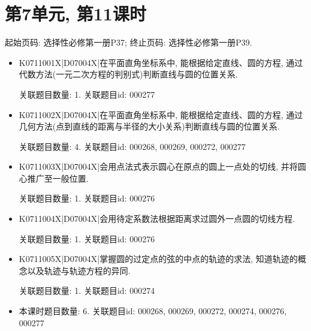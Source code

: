 \section*{第7单元, 第11课时}
起始页码: 选择性必修第一册P37; 终止页码: 选择性必修第一册P39.
\begin{itemize}
\item K0711001X|D07004X|在平面直角坐标系中, 能根据给定直线、圆的方程, 通过代数方法(一元二次方程的判别式)判断直线与圆的位置关系.

关联题目数量: 1. 关联题目id: 000277

\item K0711002X|D07004X|在平面直角坐标系中, 能根据给定直线、圆的方程, 通过几何方法(点到直线的距离与半径的大小关系)判断直线与圆的位置关系.

关联题目数量: 4. 关联题目id: 000268, 000269, 000272, 000277

\item K0711003X|D07004X|会用点法式表示圆心在原点的圆上一点处的切线, 并将圆心推广至一般位置.

关联题目数量: 1. 关联题目id: 000276

\item K0711004X|D07004X|会用待定系数法根据距离求过圆外一点圆的切线方程.

关联题目数量: 1. 关联题目id: 000276

\item K0711005X|D07004X|掌握圆的过定点的弦的中点的轨迹的求法, 知道轨迹的概念以及轨迹与轨迹方程的异同.

关联题目数量: 1. 关联题目id: 000274

\item 本课时题目数量: 6. 关联题目id: 000268, 000269, 000272, 000274, 000276, 000277

\end{itemize}

